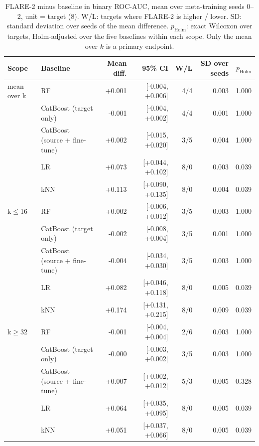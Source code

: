 \documentclass[pdflatex,sn-mathphys-num]{sn-jnl}%
\begin{document}
\begin{table}[htbp]
\centering\small
\caption{FLARE-2 minus baseline in binary ROC-AUC, mean over meta-training seeds 0--2, unit = target (8). W/L: targets where FLARE-2 is higher / lower. SD: standard deviation over seeds of the mean difference. $p_{\text{Holm}}$: exact Wilcoxon over targets, Holm-adjusted over the five baselines within each scope. Only the mean over $k$ is a primary endpoint.}\label{tab:seeds}
{\tiny\setlength{\tabcolsep}{1.8pt}\begin{tabular}{llrrrrr}
\toprule
Scope & Baseline & Mean diff. & 95\% CI & W/L & SD over seeds & $p_{\text{Holm}}$ \\
\midrule
mean over k & RF & +0.001 & [-0.004, +0.006] & 4/4 & 0.003 & 1.000 \\
 & CatBoost (target only) & -0.001 & [-0.004, +0.002] & 4/4 & 0.001 & 1.000 \\
 & CatBoost (source + fine-tune) & +0.002 & [-0.015, +0.020] & 3/5 & 0.004 & 1.000 \\
 & LR & +0.073 & [+0.044, +0.102] & 8/0 & 0.003 & 0.039 \\
 & kNN & +0.113 & [+0.090, +0.135] & 8/0 & 0.004 & 0.039 \\
\midrule
k$\leq$16 & RF & +0.002 & [-0.006, +0.012] & 3/5 & 0.003 & 1.000 \\
 & CatBoost (target only) & -0.002 & [-0.008, +0.004] & 3/5 & 0.001 & 1.000 \\
 & CatBoost (source + fine-tune) & -0.004 & [-0.034, +0.030] & 3/5 & 0.003 & 1.000 \\
 & LR & +0.082 & [+0.046, +0.118] & 8/0 & 0.005 & 0.039 \\
 & kNN & +0.174 & [+0.131, +0.215] & 8/0 & 0.009 & 0.039 \\
\midrule
k$\geq$32 & RF & -0.001 & [-0.004, +0.004] & 2/6 & 0.003 & 1.000 \\
 & CatBoost (target only) & -0.000 & [-0.003, +0.002] & 3/5 & 0.003 & 1.000 \\
 & CatBoost (source + fine-tune) & +0.007 & [+0.002, +0.012] & 5/3 & 0.005 & 0.328 \\
 & LR & +0.064 & [+0.035, +0.095] & 8/0 & 0.005 & 0.039 \\
 & kNN & +0.051 & [+0.037, +0.066] & 8/0 & 0.005 & 0.039 \\
\bottomrule
\end{tabular}}
\end{table}
\end{document}
